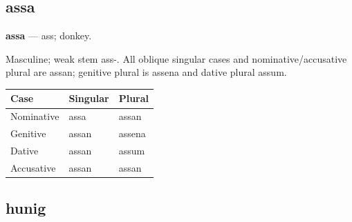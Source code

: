 \subsection*{assa}

\par\begin{minipage}{\linewidth}\raggedright
\textbf{assa} — ass; donkey.

Masculine; weak stem ass-. All oblique singular cases and nominative/\allowbreak{}accusative plural are assan; genitive plural is assena and dative plural assum.

\par\begingroup
\fontsize{10.5}{13.2}\selectfont
\setlength{\LTleft}{0pt}\setlength{\LTright}{\fill}
\noindent
\begin{tabular}{@{}>{\raggedright\arraybackslash}p{39.46mm}>{\raggedright\arraybackslash}p{39.46mm}>{\raggedright\arraybackslash}p{39.46mm}@{}}
\toprule
\textbf{Case} & \textbf{Singular} & \textbf{Plural} \\
\midrule
Nominative & assa & assan \\
Genitive & assan & assena \\
Dative & assan & assum \\
Accusative & assan & assan \\
\bottomrule
\end{tabular}
\par\endgroup

\end{minipage}\par
{}
\subsection*{hunig}


